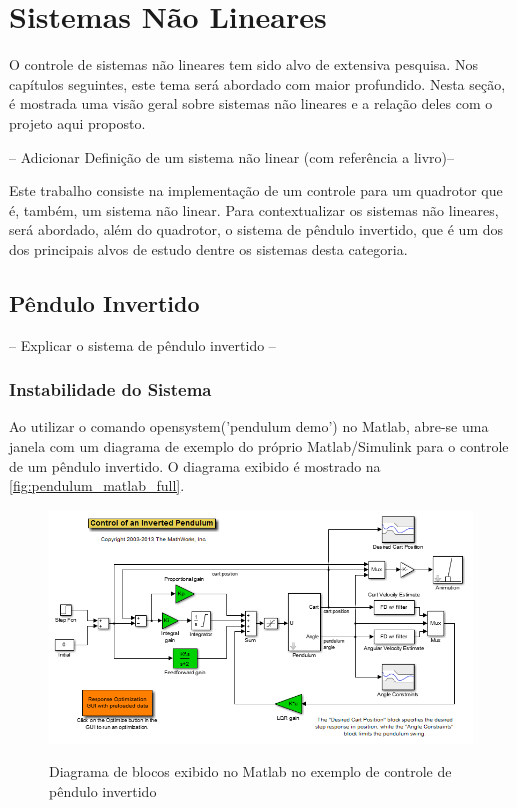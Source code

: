 %
%

\chapter{Sistemas Não Lineares}\label{chap:sistemas-nao-lineares}

O controle de sistemas não lineares tem sido alvo de extensiva pesquisa. Nos capítulos seguintes, este tema será abordado com maior profundido. Nesta seção, é mostrada  uma visão geral sobre sistemas não lineares e a relação deles com o projeto aqui proposto.

-- Adicionar Definição de um sistema não linear (com referência a livro)--

Este trabalho consiste na implementação de um controle para um quadrotor que é, também, um sistema não linear. Para contextualizar os sistemas não lineares, será abordado, além do quadrotor, o sistema de pêndulo invertido, que é um dos dos principais alvos de estudo dentre os sistemas desta categoria.

\section{Pêndulo Invertido}

-- Explicar o sistema de pêndulo invertido --

\subsection{Instabilidade do Sistema}

Ao utilizar o comando {\ttfamily open\textunderscore system('pendulum \textunderscore demo')}  no Matlab, abre-se uma janela com um diagrama de exemplo do próprio Matlab/Simulink para o controle de um pêndulo invertido. O diagrama exibido é mostrado na \autoref{fig:pendulum_matlab_full}.

\begin{figure}[!htb]
    \centering
    \caption{Diagrama de blocos exibido no Matlab no exemplo de controle de pêndulo invertido}
    \includegraphics[width=1\textwidth]{./04-figuras/pendulum_matlab_full}
    \label{fig:pendulum_matlab_full}
\end{figure}

